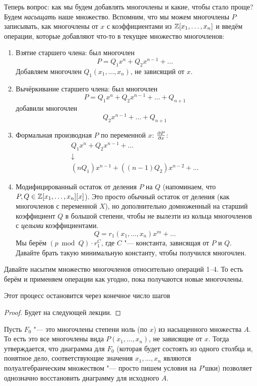 	Теперь вопрос: как мы будем добавлять многочлены и какие, чтобы стало проще?
	Будем \textit{насыщать} наше множество.
	Вспомним, что мы можем многочлены $P$ записывать, как многочлены от $x$ с коэффициентами из $\mathbb{Z}[x_1, \dots, x_n]$ и
	введём операции, которые добавляют что-то в текущее множество многочленов:
	\begin{enumerate}
	\item
		Взятие старшего члена: был многочлен
		\[ P = Q_1x^n + Q_2x^{n-1} + \dots \]
		Добавляем многочлен $Q_1(x_1, \dots, x_n)$, не зависящий от $x$.
	\item
		Вычёркивание старшего члена: был многочлен
		\[ P = Q_1 x^n + Q_2 x^{n-1} + \dots + Q_{n+1} \]
		добавили многочлен
		\[ Q_2 x^{n-1} + \dots + Q_{n+1} \]
	\item
		Формальная производная $P$ по переменной $x$: $\frac{\partial P}{\partial x}$:
		\begin{gather*}
		Q_1x^n + Q_2x^{n-1} + \dots \\
		\downarrow \\
		(nQ_1)x^{n-1} + ((n-1)Q_2)x^{n-2} + \dots
		\end{gather*}
	\item
		Модифицированный остаток от деления $P$ на $Q$ (напоминаем, что $P, Q \in \mathbb{Z}[x_1, \dots, x_n][x]$).
		Это просто обычный остаток от деления (как многочленов с переменной $X$), но дополнительно домноженный на старший коэффициент $Q$ в большой степени,
		чтобы не вылезти из кольца многочленов с \textsl{целыми} коэффициентами.
		\[ Q = r_1(x_1, \dots, x_n) x^m + \dots \]
		Мы берём $(p \bmod Q) \cdot r_1 ^ C$, где $C$ "--- константа, зависящая от $P$ и $Q$.
		Давайте брать такую минимальную константу, чтобы получился многочлен.
	\end{enumerate}
	Давайте насытим множество многочленов относительно операций 1--4.
	То есть берём и применяем операции как угодно, пока получаются новые многочлены.
	\begin{assertion}
		Этот процесс остановится через конечное число шагов
	\end{assertion}
	\begin{proof}
		Будет на следующей лекции.
	\end{proof}

	Пусть $F_0$ "--- это многочлены степени ноль (по $x$) из насыщенного множества $A$.
	То есть это все многочлены вида $P(x_1, \dots, x_n)$, не зависящие от $x$.
	Тогда утверждается, что диаграмма для $F_0$ (которая будет состоять из одного столбца и, понятное дело,
	соответствующие значения $x_1, \dots, x_n$ являются полуалгебраическим множеством "--- просто пишем условия на $P$'шки)
	позволяет однозначно восстановить диаграмму для исходного $A$.

